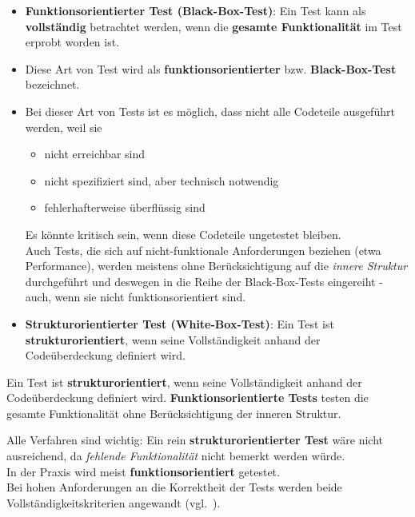 \begin{itemize}
    \item \textbf{Funktionsorientierter Test (Black-Box-Test)}: Ein Test kann als \textbf{vollständig} betrachtet werden, wenn die \textbf{gesamte Funktionalität} im Test erprobt worden ist.
    \item[] Diese Art von Test wird als \textbf{funktionsorientierter} bzw. \textbf{Black-Box-Test} bezeichnet.
    \item[] Bei dieser Art von Tests ist es möglich, dass nicht alle Codeteile ausgeführt werden, weil sie
    \begin{itemize}
        \item nicht erreichbar sind
        \item nicht spezifiziert sind, aber technisch notwendig
        \item fehlerhafterweise überflüssig sind
    \end{itemize}
    \noindent
    Es könnte kritisch sein, wenn diese Codeteile ungetestet bleiben.\\
    Auch Tests, die sich auf nicht-funktionale Anforderungen beziehen (etwa Performance), werden meistens ohne Berücksichtigung auf die \textit{innere Struktur} durchgeführt und deswegen in die Reihe der Black-Box-Tests eingereiht - auch, wenn sie nicht funktionsorientiert sind.
    \item \textbf{Strukturorientierter Test (White-Box-Test)}: Ein Test ist \textbf{strukturorientiert}, wenn seine Vollständigkeit anhand der Codeüberdeckung definiert wird.
\end{itemize}

\vspace{2mm}
\begin{tcolorbox}[title=Strukturorientierte und funktionsorientierte Tests]
    Ein Test ist \textbf{strukturorientiert}, wenn seine Vollständigkeit anhand der Codeüberdeckung definiert wird.  \textbf{Funktionsorientierte Tests} testen die gesamte Funktionalität ohne Berücksichtigung der inneren Struktur.
\end{tcolorbox}
\vspace{2mm}

\noindent
Alle Verfahren sind wichtig: Ein rein \textbf{strukturorientierter Test} wäre nicht ausreichend, da \textit{fehlende Funktionalität} nicht bemerkt werden würde.\\
In der Praxis wird meist \textbf{funktionsorientiert} getestet.\\

\noindent
Bei hohen Anforderungen an die Korrektheit der Tests werden beide Vollständigkeitskriterien angewandt (vgl.~\cite[42]{Wed09c}).
